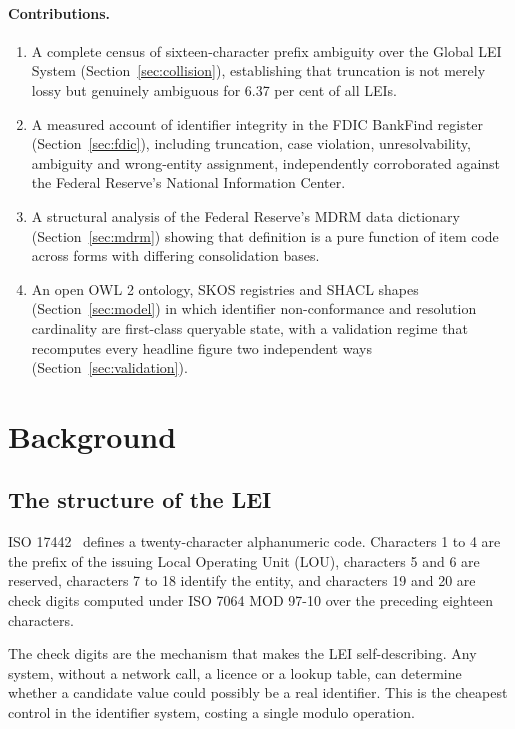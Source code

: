\documentclass[11pt]{article}
\begin{document}
\paragraph{Contributions.}
\begin{enumerate}
  \item A complete census of sixteen-character prefix ambiguity over the Global LEI System (Section~\ref{sec:collision}), establishing that truncation is not merely lossy but genuinely ambiguous for 6.37 per cent of all LEIs.
  \item A measured account of identifier integrity in the FDIC BankFind register (Section~\ref{sec:fdic}), including truncation, case violation, unresolvability, ambiguity and wrong-entity assignment, independently corroborated against the Federal Reserve's National Information Center.
  \item A structural analysis of the Federal Reserve's MDRM data dictionary (Section~\ref{sec:mdrm}) showing that definition is a pure function of item code across forms with differing consolidation bases.
  \item An open OWL 2 ontology, SKOS registries and SHACL shapes (Section~\ref{sec:model}) in which identifier non-conformance and resolution cardinality are first-class queryable state, with a validation regime that recomputes every headline figure two independent ways (Section~\ref{sec:validation}).
\end{enumerate}

\section{Background}

\subsection{The structure of the LEI}
ISO 17442~\cite{iso17442} defines a twenty-character alphanumeric code. Characters 1 to 4 are the prefix of the issuing Local Operating Unit (LOU), characters 5 and 6 are reserved, characters 7 to 18 identify the entity, and characters 19 and 20 are check digits computed under ISO 7064 MOD 97-10 over the preceding eighteen characters.

The check digits are the mechanism that makes the LEI self-describing. Any system, without a network call, a licence or a lookup table, can determine whether a candidate value could possibly be a real identifier. This is the cheapest control in the identifier system, costing a single modulo operation.
\end{document}
